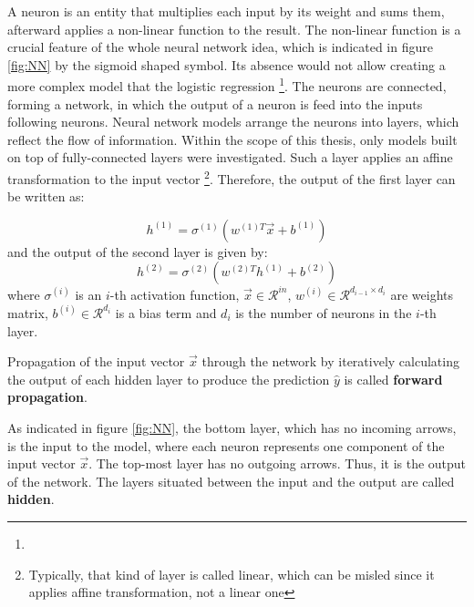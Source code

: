  A neuron is an entity that multiplies each input by its weight and sums them, afterward applies a non-linear function to the result. The non-linear function is a crucial feature of the whole neural network idea, which is indicated in figure \ref{fig:NN} by the sigmoid shaped symbol. Its absence would not allow creating a more complex model that the logistic regression \footnote{}.  The neurons are connected, forming a network, in which the output of a neuron is feed into the inputs following neurons. Neural network models arrange the neurons into layers, which reflect the flow of information. Within the scope of this thesis, only models built on top of fully-connected layers were investigated. Such a layer applies an affine transformation to the input vector \footnote{Typically, that kind of layer is called linear, which can be misled since it applies affine transformation, not a linear one}. Therefore, the output of the first layer can be written as: 

\begin{equation}
h^{(1)} = \sigma^{(1)}(w^{(1)T}\vec{x}+b^{(1)})
\end{equation}
and the output of the  second layer is given by: 
\begin{equation}
h^{(2)} = \sigma^{(2)}(w^{(2)T}h^{(1)}+b^{(2)})
\end{equation}
where $  \sigma^{(i)}$ is an $i$-th activation function, $\vec{x} \in \mathcal{R}^{in}$, $w^{(i)} \in \mathcal{R}^{d_{i-1}\times d_{i}}$ are weights matrix, $b^{(i)} \in \mathcal{R}^{d_{i}}$ is a bias term and $d_{i}$ is the number of neurons in the $i$-th layer.  

Propagation of the input vector $\vec{x}$ through the network by iteratively calculating the output of each hidden layer to produce the prediction $\hat{y}$ is called \textbf{forward propagation}.

As indicated in figure \ref{fig:NN}, the bottom layer, which has no incoming arrows, is the input to the model, where each neuron represents one component of the input vector $\vec{x}$. 
 The top-most layer has no outgoing arrows. Thus, it is the output of the network.  The layers situated between the input and the output are called \textbf{hidden}. 


